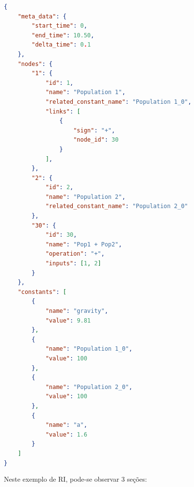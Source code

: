 \documentclass[
	12pt,				%
	openright,			%
	oneside,			%
	a4paper,			%
	main=brazil,
	english,			%
	]{ufsj-abntex2}
\begin{document}



\begin{lstlisting}[language=json]
{
    "meta_data": {
        "start_time": 0,
        "end_time": 10.50,
        "delta_time": 0.1
    },
    "nodes": {
        "1": {
            "id": 1,
            "name": "Population 1",
            "related_constant_name": "Population 1_0",
            "links": [
                {
                    "sign": "+",
                    "node_id": 30
                }
            ],
        },
        "2": {
            "id": 2,
            "name": "Population 2",
            "related_constant_name": "Population 2_0"
        },
        "30": {
            "id": 30,
            "name": "Pop1 + Pop2",
            "operation": "+",
            "inputs": [1, 2]
        }
    }, 
    "constants": [
        {
            "name": "gravity",
            "value": 9.81
        },
        {
            "name": "Population 1_0",
            "value": 100
        },
        {
            "name": "Population 2_0",
            "value": 100
        },
        {
            "name": "a",
            "value": 1.6
        }
    ]
}
\end{lstlisting}

Neste exemplo de RI, pode-se observar 3 seções:
\end{document}
